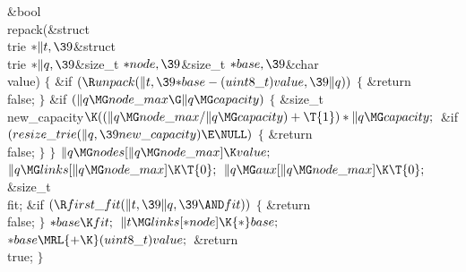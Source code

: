\Y\B\1\1\&{bool} \\{repack}(\&{struct} \\{trie} ${}{*}\|t,\39{}$\&{struct} %
\\{trie} ${}{*}\|q,\39{}$\&{size\_t} ${}{*}\\{node},\39{}$\&{size\_t} ${}{*}%
\\{base},\39{}$\&{char} \\{value})\2\2\6
${}\{{}$\1\6
\&{if} ${}(\R\\{unpack}(\|t,\39{*}\\{base}-(\\{uint8\_t})\\{value},\39\|q)){}$\5
${}\{{}$\1\6
\&{return} \\{false};\6
\4${}\}{}$\2\6
\&{if} ${}(\|q\MG\\{node\_max}\G\|q\MG\\{capacity}){}$\5
${}\{{}$\1\6
\&{size\_t} \\{new\_capacity}${}\K((\|q\MG\\{node\_max}/\|q\MG\\{capacity})+%
\T{1})*\|q\MG\\{capacity};{}$\7
\&{if} ${}(\\{resize\_trie}(\|q,\39\\{new\_capacity})\E\NULL){}$\5
${}\{{}$\1\6
\&{return} \\{false};\6
\4${}\}{}$\2\6
\4${}\}{}$\2\6
${}\|q\MG\\{nodes}[\|q\MG\\{node\_max}]\K\\{value};{}$\6
${}\|q\MG\\{links}[\|q\MG\\{node\_max}]\K\T{0};{}$\6
${}\|q\MG\\{aux}[\|q\MG\\{node\_max}]\K\T{0};{}$\7
\&{size\_t} \\{fit};\7
\&{if} ${}(\R\\{first\_fit}(\|t,\39\|q,\39{\AND}\\{fit})){}$\5
${}\{{}$\1\6
\&{return} \\{false};\6
\4${}\}{}$\2\6
${}{*}\\{base}\K\\{fit};{}$\6
${}\|t\MG\\{links}[{*}\\{node}]\K{*}\\{base};{}$\6
${}{*}\\{base}\MRL{+{\K}}(\\{uint8\_t})\\{value};{}$\6
\&{return} \\{true};\6
\4${}\}{}$\2\par
\fi

